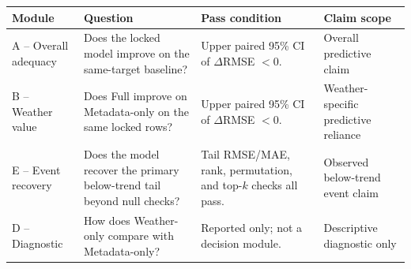 \begin{tabular}{p{}p{}p{}p{}}
\toprule
Module & Question & Pass condition & Claim scope \\
\midrule
A -- Overall adequacy & Does the locked model improve on the same-target baseline? & Upper paired 95\% CI of $\Delta$RMSE $<0$. & Overall predictive claim \\
B -- Weather value & Does Full improve on Metadata-only on the same locked rows? & Upper paired 95\% CI of $\Delta$RMSE $<0$. & Weather-specific predictive reliance \\
E -- Event recovery & Does the model recover the primary below-trend tail beyond null checks? & Tail RMSE/MAE, rank, permutation, and top-$k$ checks all pass. & Observed below-trend event claim \\
D -- Diagnostic & How does Weather-only compare with Metadata-only? & Reported only; not a decision module. & Descriptive diagnostic only \\
\bottomrule
\end{tabular}
